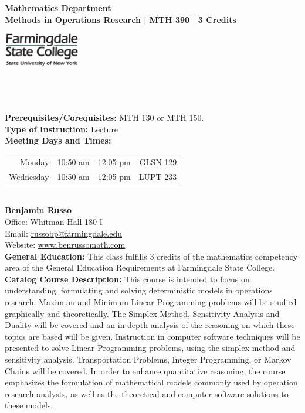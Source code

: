 \documentclass[11pt]{article}
\begin{document}
\begin{minipage}[]{.7\textwidth}
{\bf Mathematics Department}\\
{\bf  Methods in Operations Research $\mid$ MTH 390 $\mid$ 3 Credits}
\end{minipage}\begin{minipage}[]{.3\textwidth}\begin{flushright}\includegraphics[height=1.5cm]{farmingdalelogo.jpg}\end{flushright}\end{minipage}\\
\ \\ 
\ \\
{\bf Prerequisites/Corequisites:}  MTH 130 or MTH 150.\\

{\bf Type of Instruction: }Lecture\\

{\bf Meeting Days and Times: }\begin{tabular}[t]{rrr}
Monday &10:50 am - 12:05 pm & GLSN 129\\
Wednesday &10:50 am - 12:05 pm & LUPT 233\\
\end{tabular}\\

{\bf Benjamin Russo}\\
Office: Whitman Hall 180-I\\
Email:  \href{mailto:russobp@farmingdale.edu}{russobp@farmingdale.edu}\\
Website: \href{http://www.benrussomath.com}{www.benrussomath.com}\\

{\bf General Education:}
This class fulfills 3 credits of the mathematics competency area of the General Education Requirements at Farmingdale State College.\\

{\bf Catalog Course Description:}
This course is intended to focus on understanding, formulating and solving deterministic models in operations research. Maximum and Minimum Linear Programming problems will be studied graphically and theoretically. The Simplex Method, Sensitivity Analysis and Duality will be covered and an in-depth analysis of the reasoning on which these topics are based will be given. Instruction in computer software techniques will be presented to solve Linear Programming problems, using the simplex method and sensitivity analysis. Transportation Problems, Integer Programming, or Markov Chains will be covered. In order to enhance quantitative reasoning, the course emphasizes the formulation of mathematical models commonly used by operation research analysts, as well as the theoretical and computer software solutions to these models.\\
\end{document}
